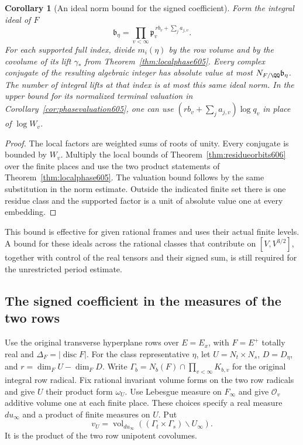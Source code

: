 \documentclass[a4paper,11pt]{article}
\newtheorem{corollary}[proposition]{Corollary}
\theoremstyle{definition}
\theoremstyle{remark}
\numberwithin{equation}{section}
\begin{document}
\begin{corollary}[An ideal norm bound for the signed coefficient]
\leavevmode\label{cor:orbitideal606}
Form the integral ideal of \(F\)
\[
           \mathfrak b_\eta=
              \prod_{v<\infty}\mathfrak p_v^{\,r b_v+\sum_j a_{j,v}} .
\]
For each supported full index, divide \(m_i(\eta)\) by the
row volume and by the covolume of its lift \(\gamma_*\) from
Theorem~\ref{thm:localphase605}. Every complex conjugate of
the resulting algebraic integer has absolute value at most
\(N_{F/\QQ}\mathfrak b_\eta\). The number of integral lifts
at that index is at most this same ideal norm. In the upper
bound for its normalized terminal valuation in
Corollary~\ref{cor:phasevaluation605}, one can use
\((r b_v+\sum_j a_{j,v})\log q_v\) in place of \(\log W_v\).
\end{corollary}
\begin{proof}
The local factors are weighted sums of roots of unity. Every
conjugate is bounded by \(W_v\). Multiply the local bounds of
Theorem~\ref{thm:residueorbits606} over the finite places and
use the two product statements of Theorem~\ref{thm:localphase605}.
The valuation bound follows by the same substitution in the
norm estimate. Outside the indicated finite set there is one
residue class and the supported factor is a unit of absolute
value one at every embedding.
\end{proof}

This bound is effective for given rational frames and uses their
actual finite levels. A bound for these ideals across the
rational classes that contribute on \([V,V^{3/2}]\), together
with control of the real tensors and their signed sum, is
still required for the unrestricted period estimate.


\subsection{The signed coefficient in the measures of the two rows}
\label{sec:rowmeasures607}

Use the original transverse hyperplane rows over \(E=E_x\),
with \(F=E^+\) totally real and \(\Delta_F=|\operatorname{disc}F|\).
For the class representative \(\eta\), let \(U=N_t\times N_s\),
\(D=D_\eta\), and \(r=\dim_F U-\dim_F D\).
Write \(\Gamma_b=N_b(F)\cap\prod_{v<\infty}K_{b,v}\) for the
original integral row radical. Fix rational invariant volume
forms on the two row radicals and give \(U\) their product
form \(\omega_U\). Use Lebesgue measure on \(F_\infty\) and
give \(\mathcal O_v\) additive volume one at each finite
place. These choices specify a real measure \(du_\infty\)
and a product of finite measures on \(U\). Put
\[
              v_U=\operatorname{vol}_{du_\infty}
                  ((\Gamma_t\times\Gamma_s)\backslash U_\infty).
\]
It is the product of the two row unipotent covolumes.
\end{document}
